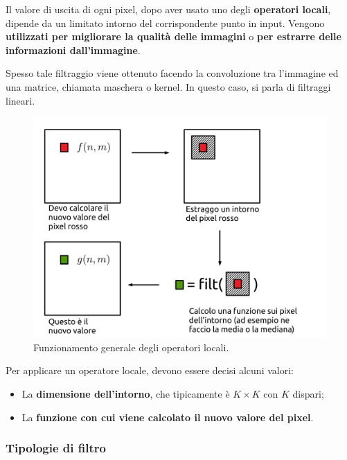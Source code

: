 \documentclass[a4paper]{article}
\begin{document}
	Il valore di uscita di ogni pixel, dopo aver usato uno degli \textcolor{Red3}{\textbf{operatori locali}}, dipende da un limitato intorno del corrispondente punto in input. Vengono \textbf{utilizzati per migliorare la qualità delle immagini} o \textbf{per estrarre delle informazioni dall'immagine}.\newline
	
	\noindent
	Spesso tale filtraggio viene ottenuto facendo la convoluzione tra l'immagine ed una matrice, chiamata maschera o kernel. In questo caso, si parla di filtraggi lineari.
	
	\begin{figure}[!htp]
		\centering
		\includegraphics[width=.8\textwidth]{img/lab/operatori-locali.pdf}
		\caption{Funzionamento generale degli operatori locali.}
	\end{figure}
	
	\noindent
	Per applicare un operatore locale, devono essere decisi alcuni valori:
	\begin{itemize}
		\item La \textbf{dimensione dell'intorno}, che tipicamente è $K \times K$ con $K$ dispari;
		
		\item La \textbf{funzione con cui viene calcolato il nuovo valore del pixel}.
	\end{itemize}\newpage
	
	\subsubsection{Tipologie di filtro}
	
\end{document}
